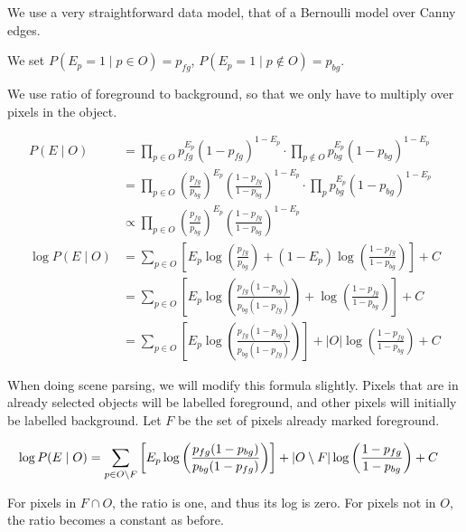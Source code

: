 
We use a very straightforward data model, that of a Bernoulli model
over Canny edges.

We set $P(E_p=1 \mid p\in O) = p_{fg}$, $P(E_p=1 \mid p\notin O) = p_{bg}$.

We use ratio of foreground to background, so that we only have to
multiply over pixels in the object.

\begin{align*}
P(E\mid O) &= \prod_{p\in O} p_{fg}^{E_p} (1-p_{fg})^{1-E_p} \cdot
\prod_{p\notin O} p_{bg}^{E_p} (1-p_{bg})^{1-E_p}\\
&= \prod_{p\in O} \left(\frac{p_{fg}}{p_{bg}}\right)^{E_p}
\left(\frac{1-p_{fg}}{1-p_{bg}}\right)^{1-E_p} \cdot
  \prod_{p} p_{bg}^{E_p} (1-p_{bg})^{1-E_p}\\
&\propto \prod_{p\in O} \left(\frac{p_{fg}}{p_{bg}}\right)^{E_p}
\left(\frac{1-p_{fg}}{1-p_{bg}}\right)^{1-E_p}\\
\log P(E\mid O)&= \sum_{p\in O}\left[ E_p \log \left(\frac{p_{fg}}{p_{bg}}\right)
+ (1-E_p) \log\left(\frac{1-p_{fg}}{1-p_{bg}}\right)\right] + C\\
&= \sum_{p\in O}\left[ E_p \log \left(\frac{p_{fg}(1-p_{bg})}{p_{bg}(1-p_{fg})}\right)
+ \log\left(\frac{1-p_{fg}}{1-p_{bg}}\right)\right] + C\\
&= \sum_{p\in O}\left[ E_p \log \left(\frac{p_{fg}(1-p_{bg})}{p_{bg}(1-p_{fg})}\right)\right]
+ |O|\log\left(\frac{1-p_{fg}}{1-p_{bg}}\right) + C
\end{align*}

When doing scene parsing, we will modify this formula slightly. Pixels
that are in already selected objects will be labelled foreground, and
other pixels will initially be labelled background. Let $F$ be the set
of pixels already marked foreground.

\begin{align*}
\log P(E\mid O) &= \sum_{p\in O\setminus F}\left[ E_p \log \left(\frac{p_{fg}(1-p_{bg})}{p_{bg}(1-p_{fg})}\right)\right]
+ |O\setminus F|\log\left(\frac{1-p_{fg}}{1-p_{bg}}\right) + C
\end{align*}

For pixels in $F\cap O$, the ratio is one, and thus its log is
zero. For pixels not in $O$, the ratio becomes a constant as before.

